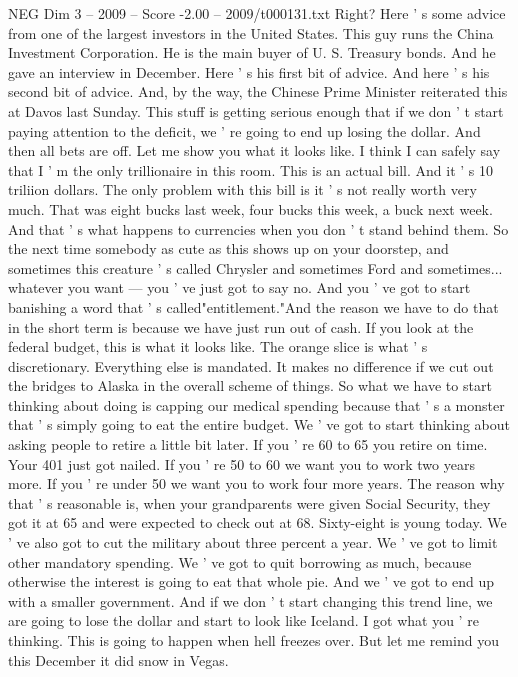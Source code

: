 \begin{textsample}{NEG Dim 3 – 2009 – Score -2.00 – 2009/t000131.txt}
Right?
Here ' s some advice from one of the largest investors in the United States.
This guy runs the China Investment Corporation.
He is the main buyer of U.
S.
Treasury bonds.
And he gave an interview in December.
Here ' s his first bit of advice.
And here ' s his second bit of advice.
And, by the way, the Chinese Prime Minister reiterated this at Davos last Sunday.
This stuff is getting serious enough that if we don ' t start paying attention to the deficit, we ' re going to end up losing the dollar.
And then all bets are off.
Let me show you what it looks like.
I think I can safely say that I ' m the only trillionaire in this room.
This is an actual bill.
And it ' s 10 triliion dollars.
The only problem with this bill is it ' s not really worth very much.
That was eight bucks last week, four bucks this week, a buck next week.
And that ' s what happens to currencies when you don ' t stand behind them.
So the next time somebody as cute as this shows up on your doorstep, and sometimes this creature ' s called Chrysler and sometimes Ford and sometimes... whatever you want — you ' ve just got to say no.
And you ' ve got to start banishing a word that ' s called"entitlement."And the reason we have to do that in the short term is because we have just run out of cash.
If you look at the federal budget, this is what it looks like.
The orange slice is what ' s discretionary.
Everything else is mandated.
It makes no difference if we cut out the bridges to Alaska in the overall scheme of things.
So what we have to start thinking about doing is capping our medical spending because that ' s a monster that ' s simply going to eat the entire budget.
We ' ve got to start thinking about asking people to retire a little bit later.
If you ' re 60 to 65 you retire on time.
Your 401 just got nailed.
If you ' re 50 to 60 we want you to work two years more.
If you ' re under 50 we want you to work four more years.
The reason why that ' s reasonable is, when your grandparents were given Social Security, they got it at 65 and were expected to check out at 68.
Sixty-eight is young today.
We ' ve also got to cut the military about three percent a year.
We ' ve got to limit other mandatory spending.
We ' ve got to quit borrowing as much, because otherwise the interest is going to eat that whole pie.
And we ' ve got to end up with a smaller government.
And if we don ' t start changing this trend line, we are going to lose the dollar and start to look like Iceland.
I got what you ' re thinking.
This is going to happen when hell freezes over.
But let me remind you this December it did snow in Vegas.

\end{textsample}
